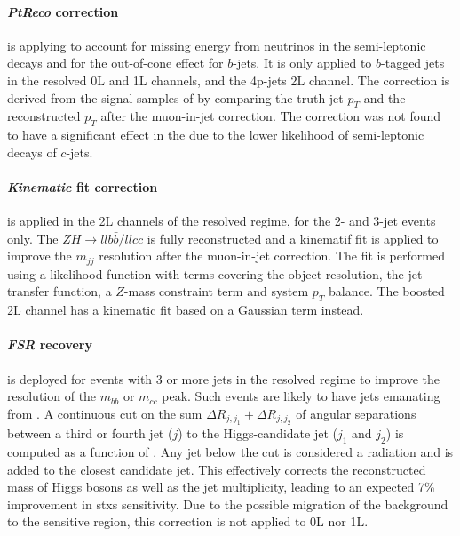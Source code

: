 \paragraph{\textit{PtReco} correction} is applying to account for missing energy from neutrinos in the semi-leptonic decays and for the out-of-cone effect for $b$-jets. It is only applied to $b$-tagged jets in the resolved \vhb 0L and 1L channels, and the 4p-jets 2L channel. The correction is derived from the signal samples of \vhb by comparing the truth jet $p_T$ and the reconstructed $p_T$ after the muon-in-jet correction. The correction was not found to have a significant effect in the \vhc due to the lower likelihood of semi-leptonic decays of $c$-jets.

\paragraph{\textit{Kinematic} fit correction} is applied in the 2L channels of the resolved regime, for the 2- and 3-jet events only. The $ZH \rightarrow llb\bar{b} / llc\bar{c}$ is fully reconstructed and a kinematif fit is applied to improve the $m_{jj}$ resolution after the muon-in-jet correction. The fit is performed using a likelihood function with terms covering the object resolution, the jet transfer function, a $Z$-mass constraint term and system $p_T$ balance. The boosted 2L channel has a kinematic fit based on a Gaussian term instead. %

\paragraph{\textit{FSR} recovery} is deployed for events with 3 or more jets in the resolved regime to improve the resolution of the $m_{bb}$ or $m_{cc}$ peak. Such events are likely to have jets emanating from . A continuous cut on the sum $\Delta R_{j, j_1} + \Delta R_{j, j_2}$ of angular separations between a third or fourth jet ($j$) to the Higgs-candidate jet ($j_1$ and $j_2$)  is computed as a function of \ptv. Any jet below the cut is considered a radiation and is added to the closest candidate jet. This effectively corrects the reconstructed mass of Higgs bosons as well as the jet multiplicity, leading to an expected 7\% improvement in \vhb \gls{stxs} sensitivity. Due to the possible migration of the \ttb background to the sensitive region, this correction is not applied to 0L nor 1L. 

